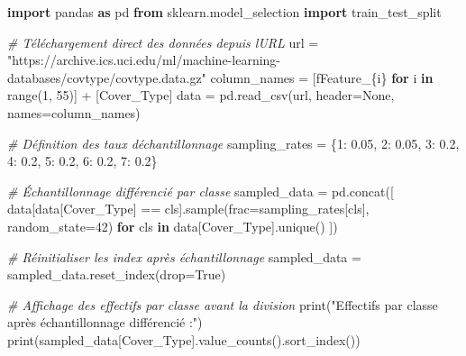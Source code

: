 \documentclass[
  letterpaper,
  DIV=11,
  numbers=noendperiod]{scrartcl}
\newenvironment{Shaded}{}{}
\newcommand{\BuiltInTok}[1]{\textcolor[rgb]{0.00,0.50,0.00}{#1}}
\newcommand{\CommentTok}[1]{\textcolor[rgb]{0.38,0.63,0.69}{\textit{#1}}}
\newcommand{\ControlFlowTok}[1]{\textcolor[rgb]{0.00,0.44,0.13}{\textbf{#1}}}
\newcommand{\DecValTok}[1]{\textcolor[rgb]{0.25,0.63,0.44}{#1}}
\newcommand{\FloatTok}[1]{\textcolor[rgb]{0.25,0.63,0.44}{#1}}
\newcommand{\ImportTok}[1]{\textcolor[rgb]{0.00,0.50,0.00}{\textbf{#1}}}
\newcommand{\KeywordTok}[1]{\textcolor[rgb]{0.00,0.44,0.13}{\textbf{#1}}}
\newcommand{\NormalTok}[1]{#1}
\newcommand{\OperatorTok}[1]{\textcolor[rgb]{0.40,0.40,0.40}{#1}}
\newcommand{\SpecialCharTok}[1]{\textcolor[rgb]{0.25,0.44,0.63}{#1}}
\newcommand{\SpecialStringTok}[1]{\textcolor[rgb]{0.73,0.40,0.53}{#1}}
\newcommand{\StringTok}[1]{\textcolor[rgb]{0.25,0.44,0.63}{#1}}
\newcommand{\VariableTok}[1]{\textcolor[rgb]{0.10,0.09,0.49}{#1}}
\begin{document}
\begin{Shaded}
\begin{Highlighting}[]
\ImportTok{import}\NormalTok{ pandas }\ImportTok{as}\NormalTok{ pd}
\ImportTok{from}\NormalTok{ sklearn.model\_selection }\ImportTok{import}\NormalTok{ train\_test\_split}

\CommentTok{\# Téléchargement direct des données depuis l\textquotesingle{}URL}
\NormalTok{url }\OperatorTok{=} \StringTok{"https://archive.ics.uci.edu/ml/machine{-}learning{-}databases/covtype/covtype.data.gz"}
\NormalTok{column\_names }\OperatorTok{=}\NormalTok{ [}\SpecialStringTok{f\textquotesingle{}Feature\_}\SpecialCharTok{\{}\NormalTok{i}\SpecialCharTok{\}}\SpecialStringTok{\textquotesingle{}} \ControlFlowTok{for}\NormalTok{ i }\KeywordTok{in} \BuiltInTok{range}\NormalTok{(}\DecValTok{1}\NormalTok{, }\DecValTok{55}\NormalTok{)] }\OperatorTok{+}\NormalTok{ [}\StringTok{\textquotesingle{}Cover\_Type\textquotesingle{}}\NormalTok{]}
\NormalTok{data }\OperatorTok{=}\NormalTok{ pd.read\_csv(url, header}\OperatorTok{=}\VariableTok{None}\NormalTok{, names}\OperatorTok{=}\NormalTok{column\_names)}

\CommentTok{\# Définition des taux d\textquotesingle{}échantillonnage}
\NormalTok{sampling\_rates }\OperatorTok{=}\NormalTok{ \{}\DecValTok{1}\NormalTok{: }\FloatTok{0.05}\NormalTok{, }\DecValTok{2}\NormalTok{: }\FloatTok{0.05}\NormalTok{, }\DecValTok{3}\NormalTok{: }\FloatTok{0.2}\NormalTok{, }\DecValTok{4}\NormalTok{: }\FloatTok{0.2}\NormalTok{, }\DecValTok{5}\NormalTok{: }\FloatTok{0.2}\NormalTok{, }\DecValTok{6}\NormalTok{: }\FloatTok{0.2}\NormalTok{, }\DecValTok{7}\NormalTok{: }\FloatTok{0.2}\NormalTok{\}}

\CommentTok{\# Échantillonnage différencié par classe}
\NormalTok{sampled\_data }\OperatorTok{=}\NormalTok{ pd.concat([}
\NormalTok{    data[data[}\StringTok{\textquotesingle{}Cover\_Type\textquotesingle{}}\NormalTok{] }\OperatorTok{==}\NormalTok{ cls].sample(frac}\OperatorTok{=}\NormalTok{sampling\_rates[cls], random\_state}\OperatorTok{=}\DecValTok{42}\NormalTok{)}
    \ControlFlowTok{for}\NormalTok{ cls }\KeywordTok{in}\NormalTok{ data[}\StringTok{\textquotesingle{}Cover\_Type\textquotesingle{}}\NormalTok{].unique()}
\NormalTok{])}

\CommentTok{\# Réinitialiser les index après échantillonnage}
\NormalTok{sampled\_data }\OperatorTok{=}\NormalTok{ sampled\_data.reset\_index(drop}\OperatorTok{=}\VariableTok{True}\NormalTok{)}

\CommentTok{\# Affichage des effectifs par classe avant la division}
\BuiltInTok{print}\NormalTok{(}\StringTok{"Effectifs par classe après échantillonnage différencié :"}\NormalTok{)}
\BuiltInTok{print}\NormalTok{(sampled\_data[}\StringTok{\textquotesingle{}Cover\_Type\textquotesingle{}}\NormalTok{].value\_counts().sort\_index())}


\end{Highlighting}
\end{Shaded}
\end{document}
